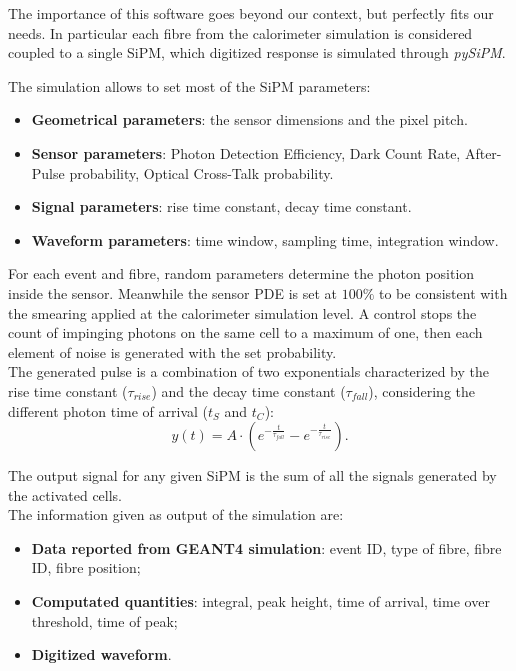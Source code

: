 The importance of this software goes beyond our context, but perfectly fits our needs. In particular each fibre from the calorimeter simulation is considered coupled to a single SiPM, which digitized response is simulated through \textit{pySiPM}.

The simulation allows to set most of the SiPM parameters:
\begin{itemize}
	\item \textbf{Geometrical parameters}: the sensor dimensions and the pixel pitch.
	\item \textbf{Sensor parameters}: Photon Detection Efficiency, Dark Count Rate, After-Pulse probability, Optical Cross-Talk probability.
	\item \textbf{Signal parameters}: rise time constant, decay time constant.
	\item \textbf{Waveform parameters}: time window, sampling time, integration window.
\end{itemize}

For each event and fibre, random parameters determine the photon position inside the sensor. %
Meanwhile the sensor PDE is set at $100\%$ to be consistent with the smearing applied at the calorimeter simulation level.
A control stops the count of impinging photons on the same cell to a maximum of one, then each element of noise is generated with the set probability.\\
The generated pulse is a combination of two exponentials characterized by the rise time constant ($\tau_{rise}$) and the decay time constant ($\tau_{fall}$), considering the different photon time of arrival ($t_S$ and $t_C$):
\begin{equation}
	y(t)= A \cdot \left( e^{-\frac{t}{\tau_{fall}}} - e^{-\frac{t}{\tau_{rise}}}\right).
	\label{form:resp_func}
\end{equation}

The output signal for any given SiPM is the sum of all the signals generated by the activated cells.\\

The information given as output of the simulation are:
\begin{itemize}
	\item \textbf{Data reported from GEANT4 simulation}: event ID, type of fibre, fibre ID, fibre position;
	\item \textbf{Computated quantities}: integral, peak height, time of arrival, time over threshold, time of peak;
	\item \textbf{Digitized waveform}.
\end{itemize}

